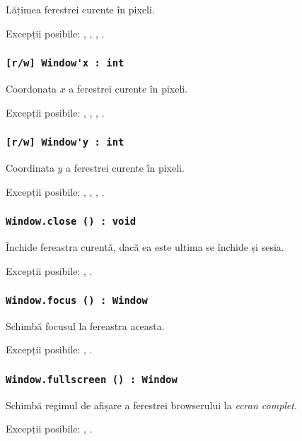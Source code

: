 Lățimea ferestrei curente în pixeli.

Excepții posibile: , , , .

\subsubsection{\lstinline|[r/w] Window'x : int|}

Coordonata $x$ a ferestrei curente în pixeli.

Excepții posibile: , , , .

\subsubsection{\lstinline|[r/w] Window'y : int|}

Coordinata $y$ a ferestrei curente în pixeli.

Excepții posibile: , , , .

\subsubsection{\lstinline|Window.close () : void|}

Închide fereastra curentă, dacă ea este ultima se închide și sesia.

Excepții posibile: , .

\subsubsection{\lstinline|Window.focus () : Window|}

Schimbă focusul la fereastra aceasta.

Excepții posibile: , .

\subsubsection{\lstinline|Window.fullscreen () : Window|}

Schimbă regimul de afișare a ferestrei browserului la \textit{ecran complet}.

Excepții posibile: , .

